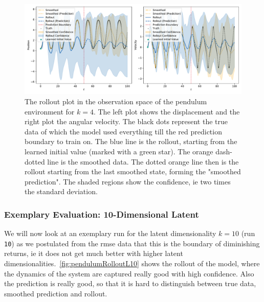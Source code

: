 			\begin{figure}
				\centering
				\includegraphics[width=\linewidth]{figures/results/pendulum/run-latent-dim-04/rollout-observations-N0.pdf}
				\caption{The rollout plot in the observation space of the pendulum environment for \(k = 4\). The left plot shows the displacement and the right plot the angular velocity. The black dots represent the true data of which the model used everything till the red prediction boundary to train on. The blue line is the rollout, starting from the learned initial value (marked with a green star). The orange dash-dotted line is the smoothed data. The dotted orange line then is the rollout starting from the last smoothed state, forming the "smoothed prediction". The shaded regions show the confidence, \ac{ie} two times the standard deviation.}
				\label{fig:pendulumRolloutL04}
			\end{figure}

		\subsubsection{Exemplary Evaluation: 10-Dimensional Latent}
			We will now look at an exemplary run for the latent dimensionality \( k = 10 \) (run \texttt{10}) as we postulated from the \ac{rmse} data that this is the boundary of diminishing returns, \ac{ie} it does not get much better with higher latent dimensionalities.~\autoref{fig:pendulumRolloutL10} shows the rollout of the model, where the dynamics of the system are captured really good with high confidence. Also the prediction is really good, so that it is hard to distinguish between true data, smoothed prediction and rollout.

